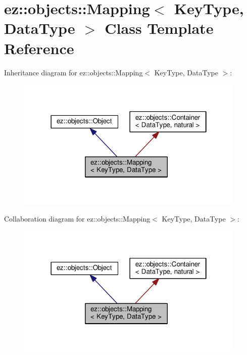 \hypertarget{classez_1_1objects_1_1Mapping}{}\section{ez\+:\+:objects\+:\+:Mapping$<$ Key\+Type, Data\+Type $>$ Class Template Reference}
\label{classez_1_1objects_1_1Mapping}


Inheritance diagram for ez\+:\+:objects\+:\+:Mapping$<$ Key\+Type, Data\+Type $>$\+:
\nopagebreak
\begin{figure}[H]
\begin{center}
\leavevmode
\includegraphics[width=310pt]{classez_1_1objects_1_1Mapping__inherit__graph}
\end{center}
\end{figure}


Collaboration diagram for ez\+:\+:objects\+:\+:Mapping$<$ Key\+Type, Data\+Type $>$\+:
\nopagebreak
\begin{figure}[H]
\begin{center}
\leavevmode
\includegraphics[width=310pt]{classez_1_1objects_1_1Mapping__coll__graph}
\end{center}
\end{figure}

